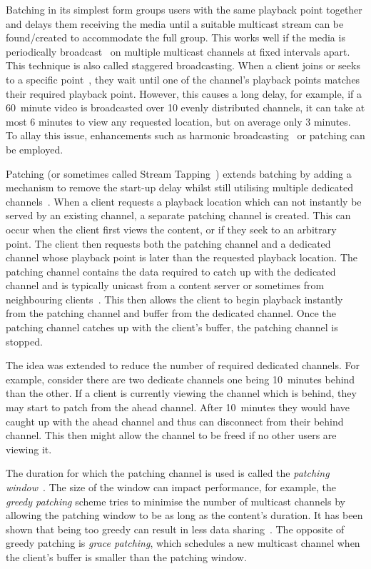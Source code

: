     Batching in its simplest form groups users with the same playback point together and delays them receiving the media until a suitable multicast stream can be found/created to accommodate the full group. This works well if the media is periodically broadcast~\cite{chiueh1995pba} on multiple multicast channels at fixed intervals apart. This technique is also called staggered broadcasting. When a client joins or seeks to a specific point~\cite{grant1994mpv}, they wait until one of the channel's playback points matches their required playback point. However, this causes a long delay, for example, if a 60~minute video is broadcasted over 10 evenly distributed channels, it can take at most 6 minutes to view any requested location, but on average only 3 minutes. To allay this issue, enhancements such as harmonic broadcasting~\cite{juhn97hbv} or patching can be employed.

    Patching (or sometimes called Stream Tapping~\cite{carter1997sta}) extends batching by adding a mechanism to remove the start-up delay whilst still utilising multiple dedicated channels~\cite{hua1998pam}. When a client requests a playback location which can not instantly be served by an existing channel, a separate patching channel is created. This can occur when the client first views the content, or if they seek to an arbitrary point. The client then requests both the patching channel and a dedicated channel whose playback point is later than the requested playback location. The patching channel contains the data required to catch up with the dedicated channel and is typically unicast from a content server or sometimes from neighbouring clients~\cite{kulkarni2008ast}. This then allows the client to begin playback instantly from the patching channel and buffer from the dedicated channel. Once the patching channel catches up with the client's buffer, the patching channel is stopped.

    The idea was extended to reduce the number of required dedicated channels. For example, consider there are two dedicate channels one being 10~minutes behind than the other. If a client is currently viewing the channel which is behind, they may start to patch from the ahead channel. After 10~minutes they would have caught up with the ahead channel and thus can disconnect from their behind channel. This then might allow the channel to be freed if no other users are viewing it.

    The duration for which the patching channel is used is called the \emph{patching window}~\cite{cai1999opp}. The size of the window can impact performance, for example, the \emph{greedy patching} scheme tries to minimise the number of multicast channels by allowing the patching window to be as long as the content's duration. It has been shown that being too greedy can result in less data sharing~\cite{hua1998pam}. The opposite of greedy patching is \emph{grace patching}, which schedules a new multicast channel when the client's buffer is smaller than the patching window.

